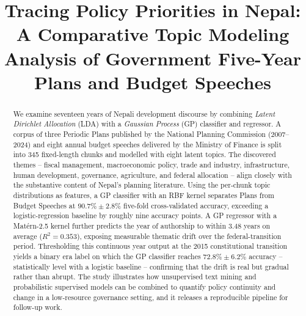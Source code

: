 \documentclass[conference]{IEEEtran}
\begin{document}
\title{Tracing Policy Priorities in Nepal:\\
A Comparative Topic Modeling Analysis of Government Five-Year Plans and Budget Speeches}

\author{
\and
{}
}

\maketitle

\begin{abstract}
We examine seventeen years of Nepali development discourse by combining
\emph{Latent Dirichlet Allocation} (LDA) with a \emph{Gaussian Process}
(GP) classifier and regressor.  A corpus of three Periodic Plans
published by the National Planning Commission (2007--2024) and eight
annual budget speeches delivered by the Ministry of Finance is split
into 345 fixed-length chunks and modelled with eight latent topics.
The discovered themes -- fiscal management, macroeconomic policy,
trade and industry, infrastructure, human development, governance,
agriculture, and federal allocation -- align closely with the
substantive content of Nepal's planning literature.  Using the
per-chunk topic distributions as features, a GP classifier with an
RBF kernel separates Plans from Budget Speeches at $90.7\% \pm 2.8\%$
five-fold cross-validated accuracy, exceeding a logistic-regression
baseline by roughly nine accuracy points.  A GP regressor with a
Mat\'ern-2.5 kernel further predicts the year of authorship to within
3.48 years on average ($R^{2}=0.353$), exposing measurable thematic
drift over the federal-transition period.  Thresholding this
continuous year output at the 2015 constitutional transition yields a
binary era label on which the GP classifier reaches
$72.8\%\pm6.2\%$ accuracy -- statistically level with a logistic
baseline -- confirming that the drift is real but gradual rather than
abrupt.  The study illustrates how
unsupervised text mining and probabilistic supervised models can be
combined to quantify policy continuity and change in a
low-resource governance setting, and it releases a reproducible
pipeline for follow-up work.
\end{abstract}
\end{document}
